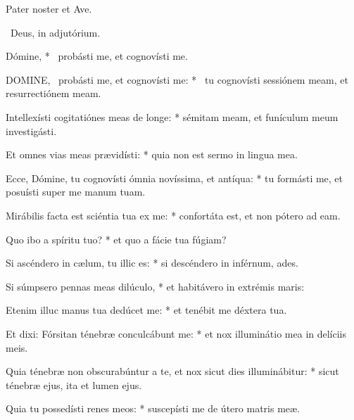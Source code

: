 
Pater noster et Ave.

\V\ Deus, in adjutórium.

 Dómine, * \textdagger\ probásti me, et cognovísti me. \textdaggerdbl


\lettrine[lines=2]{D}{OMINE}, \textdagger\ probásti me, et cognovísti me: * \textdaggerdbl\ tu cognovísti sessiónem meam, et resurrectiónem meam.

Intellexísti cogitatiónes meas de longe: * sémitam meam, et funículum meum investigásti.

Et omnes vias meas prævidísti: * quia non est sermo in lingua mea.

Ecce, Dómine, tu cognovísti ómnia novíssima, et antíqua: * tu formásti me, et posuísti super me manum tuam.

Mirábilis facta est sciéntia tua ex me: * confortáta est, et non pótero ad eam.

Quo ibo a spíritu tuo? * et quo a fácie tua fúgiam?

Si ascéndero in cælum, tu illic es: * si descéndero in inférnum, ades.

Si súmpsero pennas meas dilúculo, * et habitávero in extrémis maris:

Etenim illuc manus tua dedúcet me: * et tenébit me déxtera tua.

Et dixi: Fórsitan ténebræ conculcábunt me: * et nox illuminátio mea in delíciis meis.

Quia ténebræ non obscurabúntur a te, et nox sicut dies illuminábitur: * sicut ténebræ ejus, ita et lumen ejus.

Quia tu possedísti renes meos: * suscepísti me de útero matris meæ.

